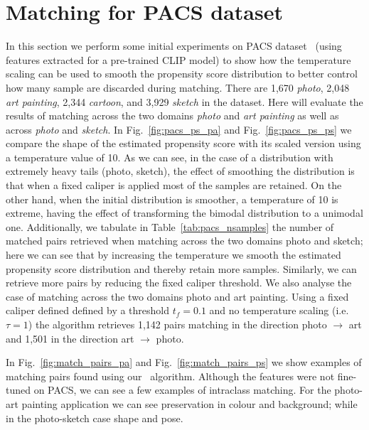 \section{Matching for PACS dataset}\label{appx:pacs_matching}
In this section we perform some initial experiments on PACS dataset~\cite{li2017deeper} (using features extracted for a
pre-trained CLIP \citep{radford2021learning} model) to show how the temperature scaling can be used
to smooth the propensity score distribution to better control how many sample are discarded during
matching. 
% 
There are 1,670 \textit{photo}, 2,048 \textit{art painting}, 2,344 \textit{cartoon}, and 3,929 \textit{sketch} in the
dataset. Here will evaluate the results of matching across the two domains \textit{photo} and
\textit{art painting} as well as across \textit{photo} and \textit{sketch}.
% 
In Fig.~\ref{fig:pacs_ps_pa} and Fig.~\ref{fig:pacs_ps_ps} we compare the shape of the estimated
propensity score with its scaled version using a temperature value of 10. 
As we can see, in the case of a distribution with extremely heavy tails (photo, sketch), the effect
of smoothing the distribution is that when a fixed caliper is applied most of the samples are
retained. 
On the other hand, when the initial distribution is smoother, a temperature of 10 is extreme,
having the effect of transforming the bimodal distribution to a unimodal one.
% 
Additionally, we tabulate in Table~\ref{tab:pacs_nsamples} the number of matched pairs retrieved when matching across the two domains photo and sketch; here we can see that by increasing the temperature we smooth the estimated propensity score distribution and thereby retain more samples. Similarly, we can retrieve more pairs by reducing the fixed caliper threshold. We also analyse the case of matching across the two domains photo and art painting. Using a fixed caliper defined defined by a threshold $t_f = 0.1 $ and no temperature scaling (i.e. $\tau=1$) the algorithm retrieves 1,142 pairs matching in the direction photo $\rightarrow$ art and 1,501 in the direction art $\rightarrow$ photo. 
% 

In Fig.~\ref{fig:match_pairs_pa} and Fig.~\ref{fig:match_pairs_ps} we show examples of matching
pairs found using our \CNN\ algorithm. Although the features were not fine-tuned on PACS, we can see
a few examples of intraclass matching. For the photo-art painting application we can see
preservation in colour and background; while in the photo-sketch case shape and pose.


